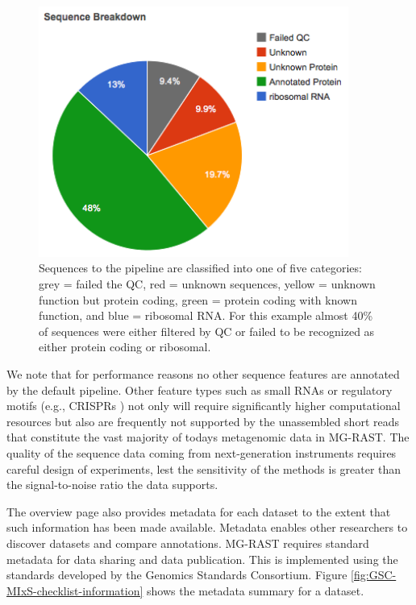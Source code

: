 \documentclass[12pt,fullpage]{report}
\begin{document}
\begin{figure}
\begin{center}
\includegraphics[width=4in]{Images/classification-pie-chart.png}
\end{center}
\caption{
Sequences to the pipeline are classified into one of five categories: grey = failed the QC, red = unknown sequences, yellow = unknown function but protein coding, green = protein coding with known function, and blue = ribosomal RNA. For this example almost 40\% of sequences were either filtered by QC or failed to be recognized as either protein coding or ribosomal.
}
\label{fig:classification-pie-chart}
\end{figure}

We note that for performance reasons no other sequence features are annotated by the default pipeline. Other feature types such as small RNAs or regulatory motifs (e.g., CRISPRs \cite{CRISPRS}) not only will require significantly higher computational resources but also are frequently not supported by the unassembled short reads that constitute the vast majority of todays metagenomic data in MG-RAST. The quality of the sequence data coming from next-generation instruments requires careful design of experiments, lest the sensitivity of the methods is greater than the signal-to-noise ratio the data supports.

The overview page also provides metadata for each dataset to the extent that such information has been made available. Metadata enables other researchers to discover datasets and compare annotations. MG-RAST requires standard metadata for data sharing and data publication. This is implemented using the standards developed by the Genomics Standards Consortium. Figure \ref{fig:GSC-MIxS-checklist-information} shows the metadata summary for a dataset.
\end{document}
